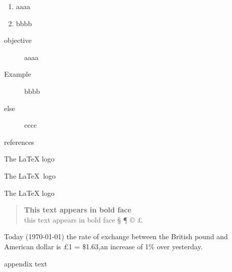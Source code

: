 \documentclass[12pt,twoside,a4paper]{article}   %
\begin{document}
	\begin{enumerate}
	\item aaaa
	\item bbbb
	\end{enumerate}
	\begin{description}
	\item[objective] aaaa
	\item[Example] bbbb
	\item[else] cccc
	\end{description}
	\begin{thebibliography}{+} %
		references
	\end{thebibliography}
	\newpage
	The \LaTeX{} logo

	The \LaTeX\ logo

	The {\LaTeX} logo

	\begin{quote}
		{\bfseries This text appears in bold face}\\
		\setlength{\parindent}{0.5cm} this text appears in bold face
		\setlength{\textwidth}{12.5cm}
			\S 
			\ddag 
			\P
			\copyright 
			\pounds			
	\end{quote}
	Today (\today) the rate of exchange between the British pound and American dollar is \pounds 1 = \$1.63,an increase of 1\% over yesterday.

	\setlength{\parskip}{1.5ex} %
	\setlength{\parindent}{0em} %
	\renewcommand{\baselinestretch}{2} %
	\setlength{\textwidth}{12.5cm} %
	\begin{appendix}
		appendix text
	\end{appendix}
\end{document}
